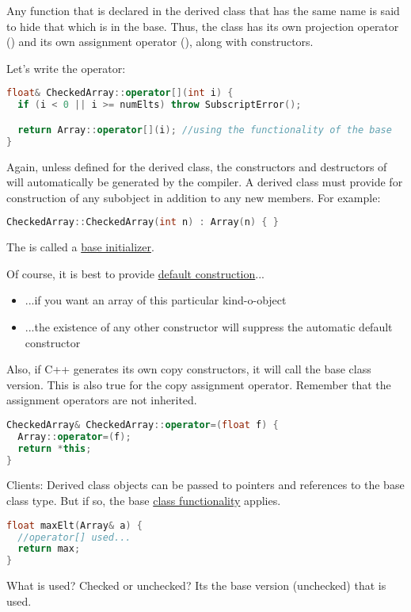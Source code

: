 Any function that is declared in the derived class that has the same name is said to hide that which is in the base. Thus, the  class has its own projection operator (\cpp{[]}) and its own assignment operator (\cpp{=}), along with constructors.

Let's write the \cpp{[]} operator:

\begin{lstlisting}[language=C++]
float& CheckedArray::operator[](int i) {
  if (i < 0 || i >= numElts) throw SubscriptError();

  return Array::operator[](i); //using the functionality of the base
}
\end{lstlisting}

Again, unless defined for the derived class, the constructors and destructors of will automatically be generated by the compiler. A derived class must provide for construction of any subobject in addition to any new members. For example:

\begin{lstlisting}[language=C++]
CheckedArray::CheckedArray(int n) : Array(n) { }
\end{lstlisting}

The  is called  a \underline{base initializer}.

Of course, it is best to provide \underline{default construction}...

\begin{itemize}
  \item ...if you want an array of this particular kind-o-object
  \item ...the existence of any other constructor will suppress the automatic default constructor
\end{itemize}

Also, if C++ generates its own copy constructors, it will call the base class version. This is also true for the copy assignment operator. Remember that the assignment operators are not inherited.

\begin{lstlisting}[language=C++]
CheckedArray& CheckedArray::operator=(float f) {
  Array::operator=(f);
  return *this;
}
\end{lstlisting}

Clients: Derived class objects can be passed to pointers and references to the base class type. But if so, the base \underline{class functionality} applies.

\begin{lstlisting}[language=C++]
float maxElt(Array& a) {
  //operator[] used...
  return max;
}
\end{lstlisting}

What  is used? Checked or unchecked? Its the base version (unchecked) that is used.